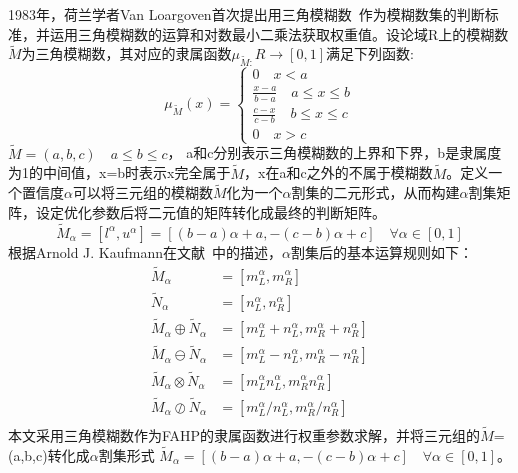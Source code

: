 1983年，荷兰学者Van Loargoven首次提出用三角模糊数~\cite{Wang2010Triangular,Chou2003The}作为模糊数集的判断标准，并运用三角模糊数的运算和对数最小二乘法获取权重值。设论域R上的模糊数$\widetilde{M}$为三角模糊数，其对应的隶属函数\begin{math}\mu_{\widetilde{M}:}R\to[0,1]\end{math}满足下列函数:
\begin{equation}
\mu_{\widetilde{M}}(x) = \left\{\begin{array}{l}
0 \quad x<a \\ [0.2cm]
\frac{x-a}{b-a} \quad a\le x\le b \\ [0.2cm]
\frac{c-x}{c-b} \quad b\le x\le c \\ [0.2cm]
0 \quad x>c
\end{array}\right.
\end{equation}
$\widetilde{M}=(a,b,c) \quad a\le b\le c$，
a和c分别表示三角模糊数的上界和下界，b是隶属度为1的中间值，x=b时表示x完全属于$\widetilde{M}$，x在a和c之外的不属于模糊数$\widetilde{M}$。定义一个置信度$\alpha$可以将三元组的模糊数$\widetilde{M}$化为一个$\alpha$割集的二元形式，从而构建$\alpha$割集矩阵，设定优化参数后将二元值的矩阵转化成最终的判断矩阵。
\begin{equation}
	\widetilde{M}_{\alpha} = [l^{\alpha},u^{\alpha}]=[(b-a)\alpha+a,-(c-b)\alpha+c] \quad \forall \alpha\in[0,1]
\end{equation}
根据Arnold J. Kaufmann在文献~中的描述，$\alpha$割集后的基本运算规则如下：
\begin{equation}
\begin{split}
	\widetilde{M}_{\alpha} &= [m_{L}^{\alpha},m_{R}^{\alpha}] \\[0.2cm]
	\widetilde{N}_{\alpha} &= [n_{L}^{\alpha},n_{R}^{\alpha}] \\[0.2cm]
	\widetilde{M}_{\alpha}\oplus \widetilde{N}_{\alpha} &= [m_{L}^{\alpha}+n_{L}^{\alpha},m_{R}^{\alpha}+n_{R}^{\alpha}] \\[0.2cm]
	\widetilde{M}_{\alpha}\ominus \widetilde{N}_{\alpha} &= [m_{L}^{\alpha}-n_{L}^{\alpha},m_{R}^{\alpha}-n_{R}^{\alpha}] \\[0.2cm]
	\widetilde{M}_{\alpha}\otimes \widetilde{N}_{\alpha} &= [m_{L}^{\alpha}n_{L}^{\alpha},m_{R}^{\alpha}n_{R}^{\alpha}] \\[0.2cm]
	\widetilde{M}_{\alpha}\oslash \widetilde{N}_{\alpha} &= [m_{L}^{\alpha}/n_{L}^{\alpha},m_{R}^{\alpha}/n_{R}^{\alpha}] \\[0.2cm]
	\end{split}
\end{equation}
本文采用三角模糊数作为FAHP的隶属函数进行权重参数求解，并将三元组的$\widetilde{M}$=(a,b,c)转化成$\alpha$割集形式
$\widetilde{M}_{\alpha} =[(b-a)\alpha+a,-(c-b)\alpha+c] \quad \forall \alpha\in[0,1]$。

